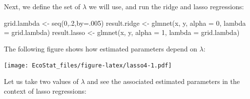 \documentclass[
  12pt,
]{book}
\newenvironment{Shaded}{\begin{snugshade}}{\end{snugshade}}
\newcommand{\AttributeTok}[1]{\textcolor[rgb]{0.77,0.63,0.00}{#1}}
\newcommand{\DecValTok}[1]{\textcolor[rgb]{0.00,0.00,0.81}{#1}}
\newcommand{\FunctionTok}[1]{\textcolor[rgb]{0.00,0.00,0.00}{#1}}
\newcommand{\NormalTok}[1]{#1}
\newcommand{\OtherTok}[1]{\textcolor[rgb]{0.56,0.35,0.01}{#1}}
\newcommand{\SpecialCharTok}[1]{\textcolor[rgb]{0.00,0.00,0.00}{#1}}
\newcommand{\StringTok}[1]{\textcolor[rgb]{0.31,0.60,0.02}{#1}}
\theoremstyle{definition}
\theoremstyle{definition}
\theoremstyle{definition}
\theoremstyle{definition}
\theoremstyle{remark}
\begin{document}
Next, we define the set of \(\lambda\) we will use, and run the ridge and lasso regressions:

\begin{Shaded}
\begin{Highlighting}[]
\NormalTok{grid.lambda }\OtherTok{\textless{}{-}} \FunctionTok{seq}\NormalTok{(}\DecValTok{0}\NormalTok{,.}\DecValTok{2}\NormalTok{,}\AttributeTok{by=}\NormalTok{.}\DecValTok{005}\NormalTok{)}
\NormalTok{result.ridge }\OtherTok{\textless{}{-}} \FunctionTok{glmnet}\NormalTok{(x, y, }\AttributeTok{alpha =} \DecValTok{0}\NormalTok{, }\AttributeTok{lambda =}\NormalTok{ grid.lambda)}
\NormalTok{result.lasso }\OtherTok{\textless{}{-}} \FunctionTok{glmnet}\NormalTok{(x, y, }\AttributeTok{alpha =} \DecValTok{1}\NormalTok{, }\AttributeTok{lambda =}\NormalTok{ grid.lambda)}
\end{Highlighting}
\end{Shaded}

The following figure shows how estimated parameters depend on \(\lambda\):

\begin{Shaded}
\end{Shaded}

\texttt{[image: EcoStat\_files/figure-latex/lasso4-1.pdf]}

Let us take two values of \(\lambda\) and see the associated estimated parameters in the context of lasso regressions:
\end{document}
